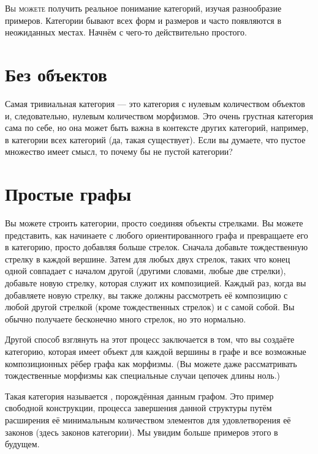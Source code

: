 
\lettrine[lhang=0.17]{В}{ы можете} получить реальное понимание категорий, изучая разнообразие
примеров. Категории бывают всех форм и размеров и часто появляются в
неожиданных местах. Начнём с чего-то действительно простого.

\section{Без объектов}

Самая тривиальная категория --- это категория с нулевым количеством объектов и, следовательно,
нулевым количеством морфизмов. Это очень грустная категория сама по себе, но она может быть
важна в контексте других категорий, например, в
категории всех категорий (да, такая существует). Если вы думаете, что пустое
множество имеет смысл, то почему бы не пустой категории?

\section{Простые графы}

Вы можете строить категории, просто соединяя объекты стрелками. Вы можете
представить, как начинаете с любого ориентированного графа и превращаете его в категорию,
просто добавляя больше стрелок. Сначала добавьте тождественную стрелку в каждой вершине.
Затем для любых двух стрелок, таких что конец одной совпадает с
началом другой (другими словами, любые две 
стрелки), добавьте новую стрелку, которая служит их композицией. Каждый раз, когда вы
добавляете новую стрелку, вы также должны рассмотреть её композицию с любой
другой стрелкой (кроме тождественных стрелок) и с самой собой. Вы обычно получаете
бесконечно много стрелок, но это нормально.

Другой способ взглянуть на этот процесс заключается в том, что вы создаёте
категорию, которая имеет объект для каждой вершины в графе и все
возможные  композиционных рёбер графа как морфизмы. (Вы можете
даже рассматривать тождественные морфизмы как специальные случаи цепочек длины
ноль.)

Такая категория называется , порождённая данным
графом. Это пример свободной конструкции, процесса завершения данной
структуры путём расширения её минимальным количеством элементов для
удовлетворения её законов (здесь законов категории). Мы увидим больше примеров
этого в будущем.


